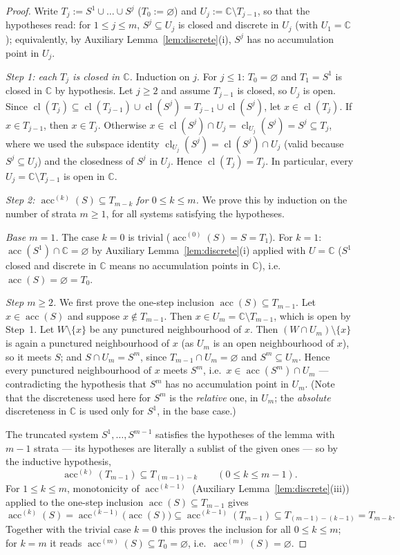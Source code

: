 \documentclass[11pt]{article}
\theoremstyle{definition}
\theoremstyle{remark}
\theoremstyle{plain}
\newcommand{\C}{\mathbb{C}}
\newcommand{\acc}{\operatorname{acc}}
\newcommand{\clo}{\operatorname{cl}}
\begin{document}
\begin{proof}
Write $T_j:=S^1\cup\dots\cup S^j$ ($T_0:=\varnothing$) and $U_j:=\C\setminus T_{j-1}$, so
that the hypotheses read: for $1\le j\le m$, $S^j\subseteq U_j$ is closed and discrete in
$U_j$ (with $U_1=\C$); equivalently, by Auxiliary Lemma~\ref{lem:discrete}(i), $S^j$ has
no accumulation point in $U_j$.

\emph{Step 1: each $T_j$ is closed in $\C$.}  Induction on $j$.  For $j\le1$:
$T_0=\varnothing$ and $T_1=S^1$ is closed in $\C$ by hypothesis.  Let $j\ge2$ and assume
$T_{j-1}$ is closed, so $U_j$ is open.  Since
$\clo(T_j)\subseteq\clo(T_{j-1})\cup\clo(S^j)=T_{j-1}\cup\clo(S^j)$, let
$x\in\clo(T_j)$.  If $x\in T_{j-1}$, then $x\in T_j$.  Otherwise
$x\in\clo(S^j)\cap U_j=\clo_{U_j}(S^j)=S^j\subseteq T_j$, where we used the subspace
identity $\clo_{U_j}(S^j)=\clo(S^j)\cap U_j$ (valid because $S^j\subseteq U_j$) and the
closedness of $S^j$ in $U_j$.  Hence $\clo(T_j)=T_j$.  In particular, every
$U_j=\C\setminus T_{j-1}$ is open in $\C$.

\emph{Step 2: $\acc^{(k)}(S)\subseteq T_{m-k}$ for $0\le k\le m$.}  We prove this by
induction on the number of strata $m\ge1$, for all systems satisfying the hypotheses.

\emph{Base $m=1$.}  The case $k=0$ is trivial ($\acc^{(0)}(S)=S=T_1$).  For $k=1$:
$\acc(S^1)\cap\C=\varnothing$ by Auxiliary Lemma~\ref{lem:discrete}(i) applied with
$U=\C$ ($S^1$ closed and discrete in $\C$ means no accumulation points in $\C$), i.e.\
$\acc(S)=\varnothing=T_0$.

\emph{Step $m\ge2$.}  We first prove the one-step inclusion
$\acc(S)\subseteq T_{m-1}$.  Let $x\in\acc(S)$ and suppose $x\notin T_{m-1}$.  Then
$x\in U_m=\C\setminus T_{m-1}$, which is open by Step~1.  Let $W\setminus\{x\}$ be any
punctured neighbourhood of $x$.  Then $(W\cap U_m)\setminus\{x\}$ is again a punctured
neighbourhood of $x$ (as $U_m$ is an open neighbourhood of $x$), so it meets $S$; and
$S\cap U_m=S^m$, since $T_{m-1}\cap U_m=\varnothing$ and $S^m\subseteq U_m$.  Hence every
punctured neighbourhood of $x$ meets $S^m$, i.e.\ $x\in\acc(S^m)\cap U_m$ ---
contradicting the hypothesis that $S^m$ has no accumulation point in $U_m$.  (Note that
the discreteness used here for $S^m$ is the \emph{relative} one, in $U_m$; the
\emph{absolute} discreteness in $\C$ is used only for $S^1$, in the base case.)

The truncated system $S^1,\dots,S^{m-1}$ satisfies the hypotheses of the lemma with $m-1$
strata --- its hypotheses are literally a sublist of the given ones --- so by the
inductive hypothesis,
\[
\acc^{(k)}(T_{m-1})\subseteq T_{(m-1)-k}\qquad(0\le k\le m-1).
\]
For $1\le k\le m$, monotonicity of $\acc^{(k-1)}$ (Auxiliary
Lemma~\ref{lem:discrete}(iii)) applied to the one-step inclusion
$\acc(S)\subseteq T_{m-1}$ gives
\[
\acc^{(k)}(S)=\acc^{(k-1)}\bigl(\acc(S)\bigr)\subseteq\acc^{(k-1)}(T_{m-1})
\subseteq T_{(m-1)-(k-1)}=T_{m-k}.
\]
Together with the trivial case $k=0$ this proves the inclusion for all $0\le k\le m$; for
$k=m$ it reads $\acc^{(m)}(S)\subseteq T_0=\varnothing$, i.e.\
$\acc^{(m)}(S)=\varnothing$.
\end{proof}
\end{document}
